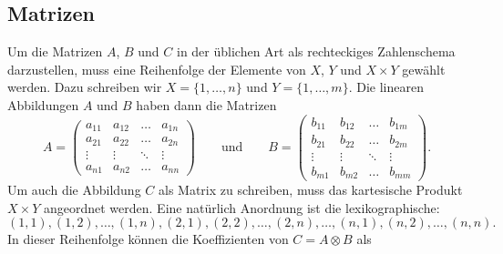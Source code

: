 \subsection{Matrizen
\label{buch:diskret:tensor:subsection:matrizen}}
Um die Matrizen $A$, $B$ und $C$ in der üblichen Art als rechteckiges
Zahlenschema darzustellen, muss eine Reihenfolge der Elemente von $X$,
$Y$ und $X\times Y$ gewählt werden.
Dazu schreiben wir $X=\{1,\dots,n\}$ und $Y=\{1,\dots,m\}$.
Die linearen Abbildungen $A$ und $B$ haben dann die Matrizen
\[
A
=
\begin{pmatrix}
a_{11}&a_{12}&\dots &a_{1n}\\
a_{21}&a_{22}&\dots &a_{2n}\\
\vdots&\vdots&\ddots&\vdots\\
a_{n1}&a_{n2}&\dots &a_{nn}
\end{pmatrix}
\qquad\text{und}\qquad
B
=
\begin{pmatrix}
b_{11}&b_{12}&\dots &b_{1m}\\
b_{21}&b_{22}&\dots &b_{2m}\\
\vdots&\vdots&\ddots&\vdots\\
b_{m1}&b_{m2}&\dots &b_{mm}
\end{pmatrix}.
\]
Um auch die Abbildung $C$ als Matrix zu schreiben, muss das kartesische
Produkt $X\times Y$ angeordnet werden.
Eine natürlich Anordnung ist die lexikographische:
\[
(1,1), (1,2),\dots,(1,n),(2,1),(2,2),\dots,(2,n),\dots,(n,1),(n,2),\dots,(n,n).
\]
In dieser Reihenfolge können die Koeffizienten von $C=A\otimes B$ als
\bgroup
\def\w{1.2}%
\def\h{0.8}%
\def\punkt#1#2{({(#2)*\w},{-(#1)*\h})}%
\def\Hdots#1#2{
	\foreach \y in {-0.2,0,0.2}{
		\fill \punkt{#1}{#2+(\y)/\w} circle[radius=0.02];
	}
}%
\def\Vdots#1#2{
	\foreach \x in {-0.2,0,0.2}{
		\fill \punkt{#1+(\x)/\h}{#2} circle[radius=0.02];
	}
}%
\def\Ddots#1#2{
	\foreach \u in {-0.2,0,0.2}{
		\fill \punkt{#1+(\u)/\h}{#2+(\u)/\w} circle[radius=0.02];
	}
}%

